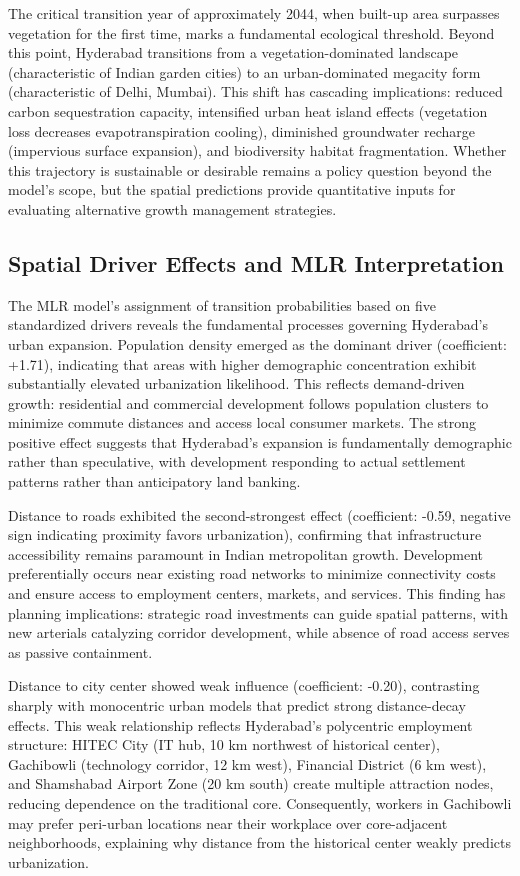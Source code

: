 \documentclass[12pt,a4paper]{article}
\begin{document}
The critical transition year of approximately 2044, when built-up area surpasses vegetation for the first time, marks a fundamental ecological threshold. Beyond this point, Hyderabad transitions from a vegetation-dominated landscape (characteristic of Indian garden cities) to an urban-dominated megacity form (characteristic of Delhi, Mumbai). This shift has cascading implications: reduced carbon sequestration capacity, intensified urban heat island effects (vegetation loss decreases evapotranspiration cooling), diminished groundwater recharge (impervious surface expansion), and biodiversity habitat fragmentation. Whether this trajectory is sustainable or desirable remains a policy question beyond the model's scope, but the spatial predictions provide quantitative inputs for evaluating alternative growth management strategies.

\subsection{Spatial Driver Effects and MLR Interpretation}

The MLR model's assignment of transition probabilities based on five standardized drivers reveals the fundamental processes governing Hyderabad's urban expansion. Population density emerged as the dominant driver (coefficient: +1.71), indicating that areas with higher demographic concentration exhibit substantially elevated urbanization likelihood. This reflects demand-driven growth: residential and commercial development follows population clusters to minimize commute distances and access local consumer markets. The strong positive effect suggests that Hyderabad's expansion is fundamentally demographic rather than speculative, with development responding to actual settlement patterns rather than anticipatory land banking.

Distance to roads exhibited the second-strongest effect (coefficient: -0.59, negative sign indicating proximity favors urbanization), confirming that infrastructure accessibility remains paramount in Indian metropolitan growth. Development preferentially occurs near existing road networks to minimize connectivity costs and ensure access to employment centers, markets, and services. This finding has planning implications: strategic road investments can guide spatial patterns, with new arterials catalyzing corridor development, while absence of road access serves as passive containment.

Distance to city center showed weak influence (coefficient: -0.20), contrasting sharply with monocentric urban models that predict strong distance-decay effects. This weak relationship reflects Hyderabad's polycentric employment structure: HITEC City (IT hub, 10 km northwest of historical center), Gachibowli (technology corridor, 12 km west), Financial District (6 km west), and Shamshabad Airport Zone (20 km south) create multiple attraction nodes, reducing dependence on the traditional core. Consequently, workers in Gachibowli may prefer peri-urban locations near their workplace over core-adjacent neighborhoods, explaining why distance from the historical center weakly predicts urbanization.
\end{document}
